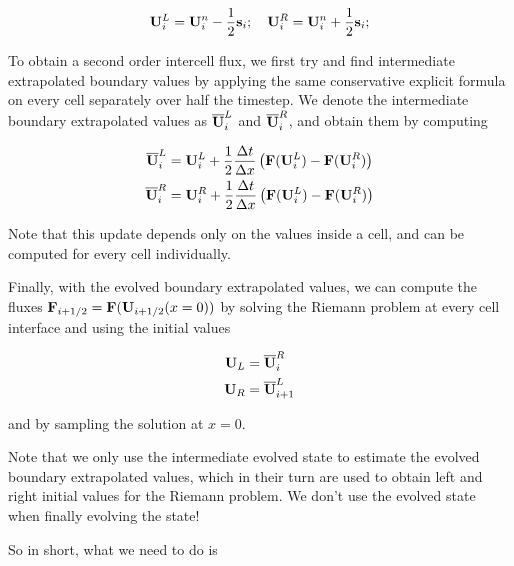 \begin{equation}
	\mathbf{U}_i^L = \mathbf{U}_i^n - \frac{1}{2} \mathbf{s}_i; \quad 	\mathbf{U}_i^R = \mathbf{U}_i^n + \frac{1}{2} \mathbf{s}_i;
\end{equation}


To obtain a second order intercell flux, we first try and find intermediate extrapolated boundary values by applying the same conservative explicit formula on every cell separately over half the timestep.
We denote the intermediate boundary extrapolated values as $\overline{\mathbf{U}}_i^L$ and $\overline{\mathbf{U}}_i^R$, and obtain them by computing

\begin{align}
	\overline{\mathbf{U}}_i^L &= \mathbf{U}_i^L + \frac{1}{2} \frac{\Delta t}{\Delta x} \left( \mathbf{F}(\mathbf{U}_i^L) - \mathbf{F}(\mathbf{U}_i^R) \right)\\
	\overline{\mathbf{U}}_i^R &= \mathbf{U}_i^R + \frac{1}{2} \frac{\Delta t}{\Delta x} \left( \mathbf{F}(\mathbf{U}_i^L) - \mathbf{F}(\mathbf{U}_i^R) \right)
\end{align}

Note that this update depends only on the values inside a cell, and can be computed for every cell individually.

Finally, with the evolved boundary extrapolated values, we can compute the fluxes $\mathbf{F}_{i + 1/2} = \mathbf{F}(\mathbf{U}_{i+1/2}(x = 0))$ by solving the Riemann problem at every cell interface and using the initial values

\begin{align}
	\mathbf{U}_L &= \overline{\mathbf{U}}_i^R\\
	\mathbf{U}_R &= \overline{\mathbf{U}}_{i+1}^L
\end{align}

and by sampling the solution at $x = 0$.


Note that we only use the intermediate evolved state to estimate the evolved boundary extrapolated values, which in their turn are used to obtain left and right initial values for the Riemann problem.
We don't use the evolved state when finally evolving the state!

So in short, what we need to do is

